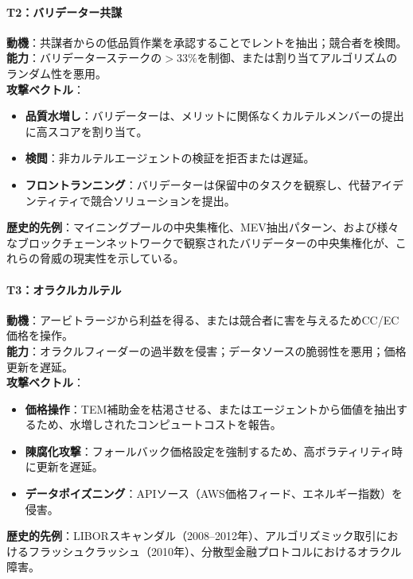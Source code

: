 \documentclass[11pt]{article}
\begin{document}
\paragraph{T2：バリデーター共謀}
\textbf{動機}：共謀者からの低品質作業を承認することでレントを抽出；競合者を検閲。\\
\textbf{能力}：バリデーターステークの$>33\%$を制御、または割り当てアルゴリズムのランダム性を悪用。\\
\textbf{攻撃ベクトル}：
\begin{itemize}[noitemsep]
  \item \textbf{品質水増し}：バリデーターは、メリットに関係なくカルテルメンバーの提出に高スコアを割り当て。
  \item \textbf{検閲}：非カルテルエージェントの検証を拒否または遅延。
  \item \textbf{フロントランニング}：バリデーターは保留中のタスクを観察し、代替アイデンティティで競合ソリューションを提出。
\end{itemize}
\textbf{歴史的先例}：マイニングプールの中央集権化、MEV抽出パターン、および様々なブロックチェーンネットワークで観察されたバリデーターの中央集権化が、これらの脅威の現実性を示している。

\paragraph{T3：オラクルカルテル}
\textbf{動機}：アービトラージから利益を得る、または競合者に害を与えるためCC/EC価格を操作。\\
\textbf{能力}：オラクルフィーダーの過半数を侵害；データソースの脆弱性を悪用；価格更新を遅延。\\
\textbf{攻撃ベクトル}：
\begin{itemize}[noitemsep]
  \item \textbf{価格操作}：TEM補助金を枯渇させる、またはエージェントから価値を抽出するため、水増しされたコンピュートコストを報告。
  \item \textbf{陳腐化攻撃}：フォールバック価格設定を強制するため、高ボラティリティ時に更新を遅延。
  \item \textbf{データポイズニング}：APIソース（AWS価格フィード、エネルギー指数）を侵害。
\end{itemize}
\textbf{歴史的先例}：LIBORスキャンダル（2008--2012年）、アルゴリズミック取引におけるフラッシュクラッシュ（2010年）、分散型金融プロトコルにおけるオラクル障害。
\end{document}
